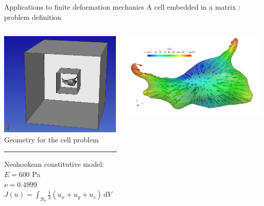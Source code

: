 \documentclass[fleqn]{beamer}
\begin{document}
\begin{frame}{Applications to finite deformation mechanics}
{A cell embedded in a matrix : problem definition}
\scriptsize
\begin{columns}
\begin{column}{0.5\textwidth}
\includegraphics[width=0.99\textwidth]{../img/mech_glial_geom} \\ [8pt]
Geometry for the cell problem
\vspace{1em}
\hrule
\vspace{1em}
Neohookean constitutive model: \\
$E = 600$ Pa \\
$\nu = 0.4999$ \\
$J(u) = \int_{\mathcal{B}_0} \frac13(u_x + u_y + u_z) \, \text{d} V$
\end{column}
\begin{column}{0.5\textwidth}%
\includegraphics[width=0.99\textwidth]{../img/mech_glial_applied_traction} \\

\end{column}
\end{columns}
\end{frame}
\end{document}

